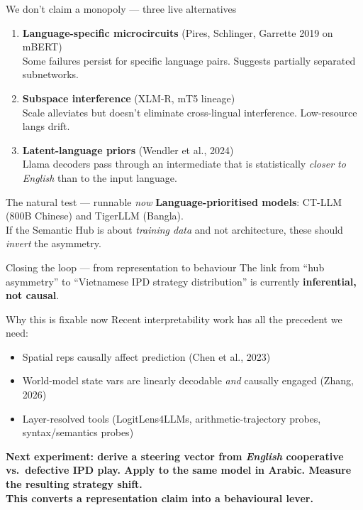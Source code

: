 \documentclass[11pt,aspectratio=169]{beamer}
\newcommand{\takeaway}[1]{%
  \begin{center}
    \colorbox{rsnavy!10}{%
      \begin{minipage}{0.92\textwidth}
        \centering\textbf{#1}
      \end{minipage}}
  \end{center}}
\begin{document}
\begin{frame}{We don't claim a monopoly --- three live alternatives}
    \large
    \begin{enumerate}
        \setlength\itemsep{0.5em}
        \item \textbf{Language-specific microcircuits} \scriptsize (Pires, Schlinger, Garrette 2019 on mBERT)\\
        \normalsize Some failures persist for specific language pairs. Suggests partially separated subnetworks.
        \item \textbf{Subspace interference} \scriptsize (XLM-R, mT5 lineage)\\
        \normalsize Scale alleviates but doesn't eliminate cross-lingual interference. Low-resource langs drift.
        \item \textbf{Latent-language priors} \scriptsize (Wendler et al., 2024)\\
        \normalsize Llama decoders pass through an intermediate that is statistically \emph{closer to English} than to the input language.
    \end{enumerate}
    \vspace{0.3cm}
    \begin{block}{The natural test --- runnable \emph{now}}
        \textbf{Language-prioritised models}: CT-LLM (800B Chinese) and TigerLLM (Bangla).\\[4pt]
        If the Semantic Hub is about \emph{training data} and not architecture, these should \emph{invert} the asymmetry.
    \end{block}
\end{frame}

\begin{frame}{Closing the loop --- from representation to behaviour}
    \large
    The link from ``hub asymmetry'' to ``Vietnamese IPD strategy distribution'' is currently \textbf{inferential, not causal}.
    \vspace{0.3cm}
    \begin{block}{Why this is fixable now}
        Recent interpretability work has all the precedent we need:
        \begin{itemize}
            \setlength\itemsep{0.2em}
            \item Spatial reps causally affect prediction \scriptsize (Chen et al., 2023)
            \item World-model state vars are linearly decodable \emph{and} causally engaged \scriptsize (Zhang, 2026)
            \item Layer-resolved tools (LogitLens4LLMs, arithmetic-trajectory probes, syntax/semantics probes)
        \end{itemize}
    \end{block}
    \vspace{0.3cm}
    \takeaway{Next experiment: derive a steering vector from \emph{English} cooperative vs.\ defective IPD play. Apply to the same model in Arabic. Measure the resulting strategy shift.\\This converts a representation claim into a behavioural lever.}
\end{frame}
\end{document}
